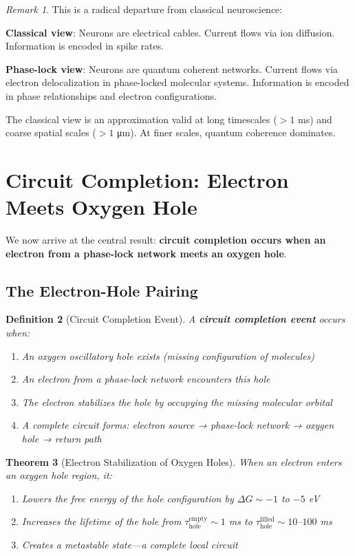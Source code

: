 \documentclass[11pt]{article}
\newtheorem{theorem}{Theorem}[section]
\newtheorem{definition}[theorem]{Definition}
\theoremstyle{remark}
\newtheorem{remark}[theorem]{Remark}
\begin{document}
\begin{remark}
This is a radical departure from classical neuroscience:

\textbf{Classical view}: Neurons are electrical cables. Current flows via ion diffusion. Information is encoded in spike rates.

\textbf{Phase-lock view}: Neurons are quantum coherent networks. Current flows via electron delocalization in phase-locked molecular systems. Information is encoded in phase relationships and electron configurations.

The classical view is an approximation valid at long timescales ($> 1$ ms) and coarse spatial scales ($> 1$ μm). At finer scales, quantum coherence dominates.
\end{remark}

\section{Circuit Completion: Electron Meets Oxygen Hole}

We now arrive at the central result: \textbf{circuit completion occurs when an electron from a phase-lock network meets an oxygen hole}.

\subsection{The Electron-Hole Pairing}

\begin{definition}[Circuit Completion Event]
\label{def:circuit_completion}
A \textbf{circuit completion event} occurs when:
\begin{enumerate}
\item An oxygen oscillatory hole exists (missing configuration of  molecules)
\item An electron from a phase-lock network encounters this hole
\item The electron stabilizes the hole by occupying the missing molecular orbital
\item A complete circuit forms: electron source → phase-lock network → oxygen hole → return path
\end{enumerate}
\end{definition}

\begin{theorem}[Electron Stabilization of Oxygen Holes]
\label{thm:electron_stabilization}
When an electron enters an oxygen hole region, it:
\begin{enumerate}
\item Lowers the free energy of the hole configuration by $\Delta G \sim -1$ to $-5$ eV
\item Increases the lifetime of the hole from $\tau_{\text{hole}}^{\text{empty}} \sim 1$ ms to $\tau_{\text{hole}}^{\text{filled}} \sim 10$--$100$ ms
\item Creates a metastable state—a \textit{complete local circuit}
\end{enumerate}
\end{theorem}
\end{document}
